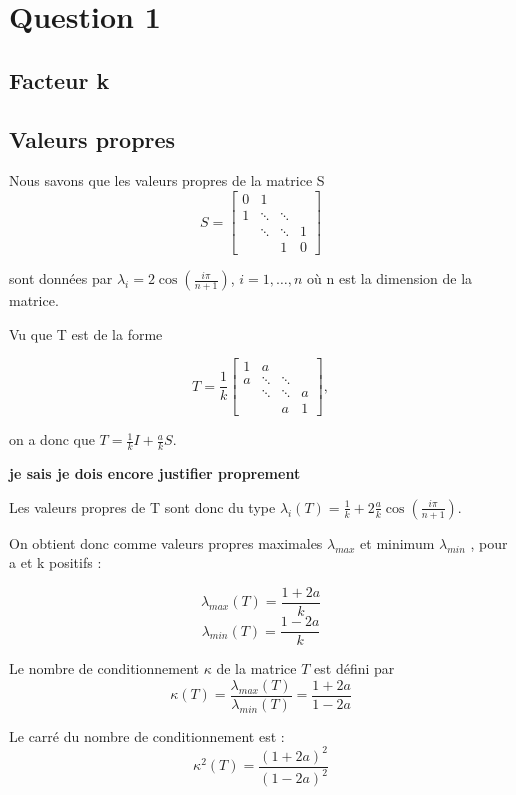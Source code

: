 \section{Question 1}

\subsection{Facteur k}

\subsection{Valeurs propres}
	Nous savons que les valeurs propres de la matrice S 
	$$
S = 	
 \left[
 \begin{array}{cccc}
    0 & 1 		& 			& \\
    1 & \ddots 	& \ddots 	& \\
      & \ddots 	& \ddots 	& 1 \\
      & 		& 1			& 0
  \end{array}
  \right]
$$

sont données par $\lambda_i = 2 \cos(\frac{i\pi}{n+1})$, $i= 1, \ldots , n$ où n est la dimension de la matrice.

Vu que T est de la forme 

$$
 T = \frac{1}{k}
 \left[
 \begin{array}{cccc}
    1 & a 		& 			& \\
    a & \ddots 	& \ddots 	& \\
      & \ddots 	& \ddots 	& a \\
      & 		& a			& 1
  \end{array}
  \right] ,
$$

on a donc que $T = \frac{1}{k} I + \frac{a}{k} S$.

\textbf{je sais je dois encore justifier proprement}

Les valeurs propres de T sont donc du type $\lambda_i(T) = \frac{1}{k} + 2 \frac{a}{k} \cos(\frac{i\pi}{n+1})$.

On obtient donc comme valeurs propres maximales $\lambda_{max}$ et minimum $\lambda_{min}$ , pour a et k positifs : 

	$$\lambda_{max} (T) =  \frac{1+2a}{k} $$
	$$\lambda_{min} (T) =  \frac{1-2a}{k} $$
	
Le nombre de conditionnement $\kappa$ de la matrice $T$ est défini par 
\begin{equation}
	\kappa (T) = \frac{\lambda_{max} (T)}{\lambda_{min} (T)} = \frac{1+2a}{1-2a}
\end{equation}
	
Le carré du nombre de conditionnement est :
\begin{equation}
	\kappa^2 (T) = \frac{(1+2a)^2}{(1-2a)^2}
\end{equation}
	

